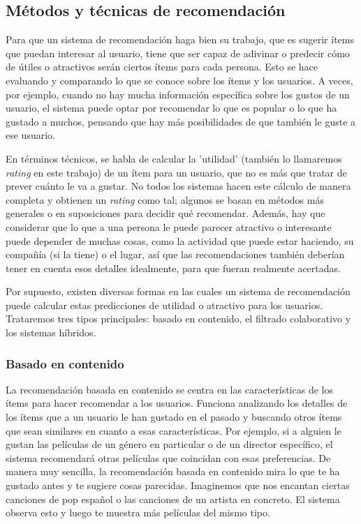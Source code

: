 \subsection{Métodos y técnicas de recomendación\label{SEC:METODOS_RECOMENDACION}}

Para que un sistema de recomendación haga bien su trabajo, que es sugerir ítems que puedan interesar al usuario, tiene que ser capaz de adivinar o predecir
 cómo de útiles o atractivos serán ciertos ítems para cada persona. Esto se hace evaluando y comparando lo que se conoce sobre los ítems y 
 los usuarios. A veces, por ejemplo, cuando no hay mucha información específica sobre los gustos de un usuario, el sistema puede optar por recomendar lo que es popular
  o lo que ha gustado a muchos, pensando que hay más posibilidades de que también le guste a ese usuario.

En términos técnicos, se habla de calcular la 'utilidad' (también lo llamaremos \textit{rating} en este trabajo) de un ítem para un usuario, que no es más
 que tratar de prever cuánto le va a gustar. No todos los sistemas hacen este cálculo de manera completa y obtienen un \textit{rating} como tal; algunos 
 se basan en métodos más generales o en suposiciones para decidir qué recomendar. Además, hay que considerar que lo que a una persona le puede parecer
 atractivo o interesante puede depender de muchas cosas, como la actividad que puede estar haciendo, su compañía (si la tiene) o el lugar, así que las recomendaciones 
 también deberían tener en cuenta esos detalles idealmente, para que fueran realmente acertadas.

 Por supuesto, existen diversas formas en las cuales un sistema de recomendación puede calcular estas predicciones de utilidad o atractivo para los usuarios.
 Trataremos tres tipos principales: basado en contenido, el filtrado colaborativo y los sistemas híbridos. 


 \subsubsection{Basado en contenido\label{SEC:RECOMENDADORES_CONTENIDO}}
 La recomendación basada en contenido se centra en las características de los ítems para hacer recomendar a los usuarios. Funciona analizando los 
 detalles de los ítems que a un usuario le han gustado en el pasado y buscando otros ítems que sean similares en cuanto a esas características. Por 
 ejemplo, si a alguien le gustan las películas de un género en particular o de un director específico, el sistema recomendará otras películas que 
 coincidan con esas preferencias. De manera muy sencilla, la recomendación basada en contenido mira lo que te ha gustado antes y te sugiere cosas parecidas. 
 Imaginemos que nos encantan ciertas canciones de pop español o las canciones de un artista en concreto. El sistema observa esto y luego te muestra más películas del mismo tipo.

